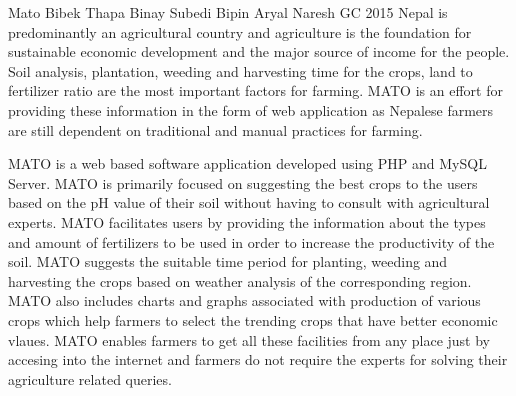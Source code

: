  \begin{conf-abstract}[]
{Mato}
{
Bibek Thapa
Binay Subedi
Bipin Aryal
Naresh GC
}
{2015}
Nepal is predominantly an agricultural country and agriculture is the foundation for sustainable economic development and the major source of income for the people. Soil analysis, plantation, weeding and harvesting time for the crops, land to fertilizer ratio are the most important factors for farming. MATO is an effort for providing these information in the form of web application as Nepalese farmers are still dependent on traditional and manual practices for farming.

MATO is a web based software application developed using PHP and MySQL Server. MATO is primarily focused on suggesting the best crops to the users based on the pH value of their soil without having to consult with agricultural experts. MATO facilitates users by providing the information about the types and amount of fertilizers to be used in order to increase the productivity of the soil. MATO suggests the suitable time period for planting, weeding and harvesting the crops based on weather analysis of the corresponding region. MATO also includes charts and graphs associated with production of various crops which help farmers to select the trending crops that have better economic vlaues. MATO enables farmers to get all these facilities from any place just by accesing into the internet and farmers do not require the experts for solving their agriculture related queries.
  \end{conf-abstract}